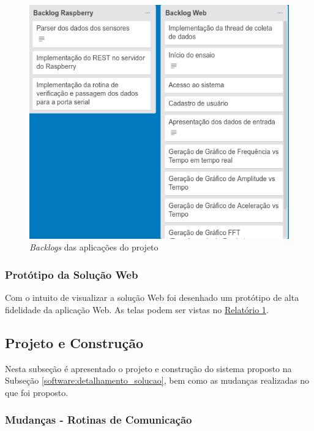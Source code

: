 \begin{figure}[H]
\centering
\label{backlog_produto}
\includegraphics[keepaspectratio=true,scale=0.55]	{figuras/backlog_produto.png}
\caption{\textit{Backlogs} das aplicações do projeto}
\end{figure}

\subsubsection*{\textbf{Protótipo da Solução Web}}

Com o intuito de visualizar a solução Web foi desenhado um protótipo de alta fidelidade da aplicação Web. 
As telas podem ser vistas no \href{https://drive.google.com/file/d/0B5InkGKx6O-MR1B3eVYzZFpjQ3c/view?usp=sharing}{Relatório 1}. 

\subsection{Projeto e Construção}

Nesta subseção é apresentado o projeto e construção do sistema proposto na Subseção \ref{software:detalhamento_solucao}, bem
como as mudanças realizadas no que foi proposto.

\subsubsection*{\textbf{Mudanças - Rotinas de Comunicação}}

